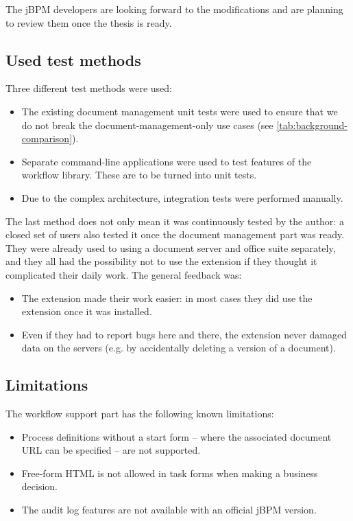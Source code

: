 The jBPM developers are looking forward to the modifications and are planning
to review them once the thesis is ready.

\subsection*{Used test methods}

Three different test methods were used:

\begin{itemize}
\item The existing document management unit tests were used to ensure that we do not break the document-management-only use cases (see \autoref{tab:background-comparison}).
\item Separate command-line applications were used to test features of the workflow library. These are to be turned into unit tests.
\item Due to the complex architecture, integration tests were performed manually.
\end{itemize}

The last method does not only mean it was continuously tested by the author: a closed set of users also tested it once the document management part was ready. They were already used to using a document server and office suite separately, and they all had the possibility not to use the extension if they thought it complicated their daily work. The general feedback was:

\begin{itemize}
\item The extension made their work easier: in most cases they did use the extension once it was installed.
\item Even if they had to report bugs here and there, the extension never
damaged data on the servers (e.g. by accidentally deleting a version of a
document).
\end{itemize}

\subsection*{Limitations}

The workflow support part has the following known limitations:

\begin{itemize}
\item Process definitions without a start form -- where the associated document URL can be specified -- are not supported.
\item Free-form HTML is not allowed in task forms when making a business decision.
\item The audit log features are not available with an official jBPM version.
\end{itemize}

